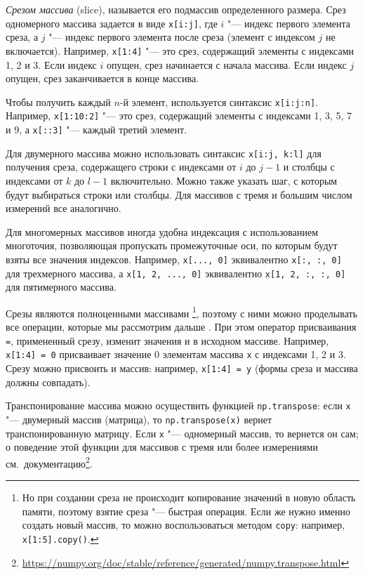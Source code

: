 \emph{Срезом массива} (slice), называется его подмассив определенного размера.
Срез одномерного массива задается в виде \verb"x[i:j]", где $i$ "--- индекс первого элемента среза, а $j$ "--- индекс первого элемента после среза (элемент с индексом $j$ не включается).
Например, \verb"x[1:4]" "--- это срез, содержащий элементы с индексами 1, 2 и 3.
Если индекс $i$ опущен, срез начинается с начала массива.
Если индекс $j$ опущен, срез заканчивается в конце массива.

Чтобы получить каждый $n$-й элемент, используется синтаксис \verb"x[i:j:n]".
Например, \verb"x[1:10:2]" "--- это срез, содержащий элементы с индексами 1, 3, 5, 7 и 9, а \verb"x[::3]" "--- каждый третий элемент.

Для двумерного массива можно использовать синтаксис \verb"x[i:j, k:l]" для получения среза, содержащего строки с индексами от $i$ до $j-1$ и столбцы с индексами от $k$ до $l-1$ включительно.
Можно также указать шаг, с которым будут выбираться строки или столбцы.
Для массивов с тремя и большим числом измерений все аналогично.

Для многомерных массивов иногда удобна индексация с использованием многоточия, позволяющая пропускать промежуточные оси, по которым будут взяты все значения индексов.
Например, \verb"x[..., 0]" эквивалентно \verb"x[:, :, 0]" для трехмерного массива, а \verb"x[1, 2, ..., 0]" эквивалентно \verb"x[1, 2, :, :, 0]" для пятимерного массива. 

Срезы являются полноценными массивами%
\footnote{Но при создании среза не происходит копирование значений в новую область памяти, поэтому взятие среза "--- быстрая операция.
Если же нужно именно создать новый массив, то можно воспользоваться методом \verb"copy": например, \verb"x[1:5].copy()".},
поэтому с ними можно проделывать все операции, которые мы рассмотрим дальше%
.
При этом оператор присваивания \verb"=", примененный срезу, изменит значения и в исходном массиве. 
Например, \verb"x[1:4] = 0" присваивает значение 0 элементам массива \verb"x" с индексами 1, 2 и 3.
Срезу можно присвоить и массив: например, \verb"x[1:4] = y" (формы среза и массива должны совпадать).

Транспонирование массива можно осуществить функцией \verb"np.transpose": если \verb"x" "--- двумерный массив (матрица), то \verb"np.transpose(x)" вернет транспонированную матрицу.
Если \verb"x" "--- одномерный массив, то вернется он сам; о поведение этой функции для массивов с тремя или более измерениями см.~документацию\footnote{\url{https://numpy.org/doc/stable/reference/generated/numpy.transpose.html}}.

